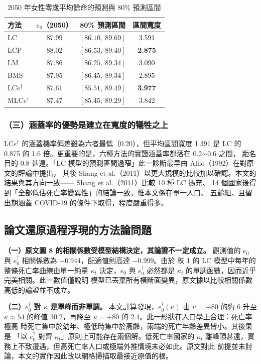 \documentclass[UTF8, fontset=macnew, a4paper, 12pt]{ctexart}
\newcommand{\edag}{e_0^{\dagger}}
\newcommand{\LCe}{\mathrm{LC}e^{\dagger}}
\begin{document}
\begin{table}[H]
\centering
\caption{2050 年女性零歲平均餘命的預測與 80\% 預測區間}
\small
\begin{tabular}{lccc}
\toprule
方法 & $e_0$（2050） & 80\% 預測區間 & 區間寬度\\
\midrule
LC      & 87.99 & $[86.10,\ 89.69]$ & 3.591\\
LCP     & 88.02 & $[86.53,\ 89.40]$ & \textbf{2.875}\\
LM      & 87.86 & $[86.25,\ 89.34]$ & 3.090\\
BMS     & 87.95 & $[86.45,\ 89.34]$ & 2.895\\
$\LCe$  & 87.61 & $[85.51,\ 89.49]$ & \textbf{3.977}\\
M$\LCe$ & 87.47 & $[85.45,\ 89.29]$ & 3.842\\
\bottomrule
\end{tabular}
\label{tab:e0}
\end{table}

\subsubsection{（三）涵蓋率的優勢是建立在寬度的犧牲之上}

$\LCe$ 的涵蓋機率偏差雖為六者最低（0.20），但平均區間寬度 1.391 是 LC 的
0.875 的 1.6 倍。更重要的是，六種方法的實證涵蓋率都落在 0.2$\sim$0.6 之間，
距名目的 0.8 甚遠。「LC 模型的預測區間過窄」此一診斷最早由 Alho（1992）在對原文的評論中提出，
其後 Shang et al.（2011）以更大規模的比較加以確認。本文的結果與其方向一致——
Shang et al.（2011）比較 10 種 LC 擴充、
14 個國家後得到「全部低估死亡率變異性」的結論一致，惟本文係在單一人口、
五齡組、且留出期涵蓋 COVID-19 的條件下取得，程度嚴重得多。

\subsection{論文還原過程浮現的方法論問題}

\textbf{（一）原文圖 8 的相關係數受模型結構決定，其論證不一定成立。}
觀測值的 $e_0$ 與 $\edag$ 相關係數為 $-0.944$，配適值則高達 $-0.999$。由於
秩 1 的 LC 模型中每年的整條死亡率曲線由單一純量 $\kappa_t$ 決定，$e_0$ 與
$\edag$ 必然都是 $\kappa_t$ 的單調函數，因而近乎完美相關。此一數值僅說明
模型已丟棄所有橫斷面變異，原文據以比較相關係數高低的論證並不成立。

\textbf{（二）$\edag$ 對 $\kappa$ 是單峰而非單調。}
本文計算發現，$\edag(\kappa)$ 由 $\kappa=-80$ 的約 6 升至 $\kappa\approx54$
的峰值 30.2，再降至 $\kappa=+80$ 的 2.4。此一形狀在人口學上合理：死亡率極高
時死亡集中於幼年、極低時集中於高齡，兩端的死亡年齡差異皆小。其後果是
「以 $\edag$ 對齊 $\kappa_t$」原則上可能存在兩個解。低死亡率國家的 $\kappa_t$
離峰頂甚遠，實務上不致遭遇，但高死亡率人口或極端外推情境未必如此。原文對此
前提並未討論，本文的實作因此改以網格掃描取最接近原值的根。
\end{document}
